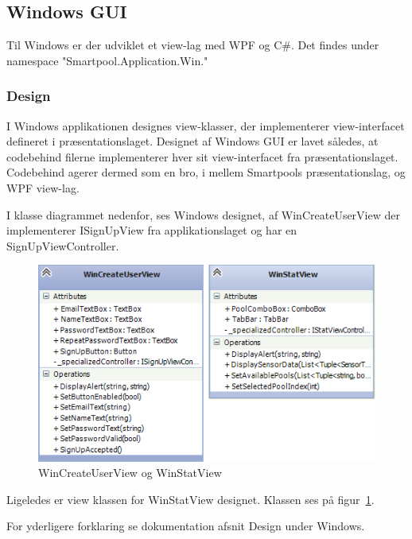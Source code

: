 \subsection{Windows GUI}
Til Windows er der udviklet et view-lag med WPF og C\#. Det findes under namespace "Smartpool.Application.Win."

\subsubsection{Design}
I Windows applikationen designes view-klasser, der implementerer view-interfacet defineret i præsentationslaget.
Designet af Windows GUI er lavet således, at codebehind filerne implementerer hver sit view-interfacet fra præsentationslaget. Codebehind agerer dermed som en bro, i mellem Smartpools præsentationslag, og WPF view-lag.

I klasse diagrammet nedenfor, ses Windows designet, af WinCreateUserView der implementerer ISignUpView fra applikationslaget og har en SignUpViewController.
\begin{figure}
	\centering
	\includegraphics[width=0.7\linewidth]{figs/design/wincreateuserandwinstatviewview}
	\caption{WinCreateUserView og WinStatView}
	\label{fig:wincreateuserandwinstatviewview}
\end{figure}

Ligeledes er view klassen for WinStatView designet.
Klassen ses på figur~\ref{fig:wincreateuserandwinstatviewview}.

For yderligere forklaring se dokumentation afsnit Design under Windows.